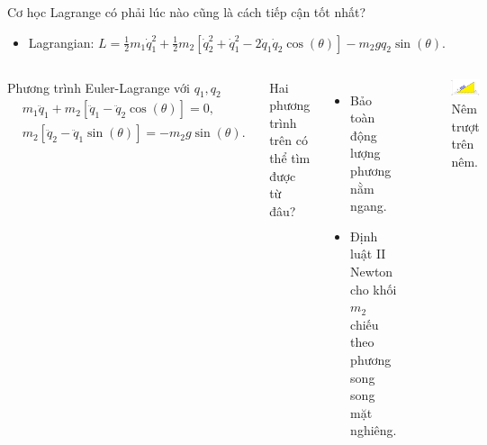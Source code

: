 \begin{frame}{Cơ học Lagrange có phải lúc nào cũng là cách tiếp cận tốt nhất?}
\vspace{-2mm}
\begin{itemize}
    \item Lagrangian: \(L = \frac{1}{2} m_1 \dot{q}_1^2 + \frac{1}{2} m_2 \left[ \dot{q}_2^2 + \dot{q}_1^2 - 2 \dot{q}_1 \dot{q}_2 \cos (\theta) \right] - m_2 g q_2 \sin (\theta).\)
\end{itemize}

\begin{columns}
    Phương trình Euler-Lagrange với \(q_1, q_2\)
    \begin{equation}
    \begin{split}
        & m_1 \ddot{q}_1 + m_2 \left[ \ddot{q}_1 - \ddot{q}_2 \cos (\theta) \right] = 0,\\
        & m_2 \left[ \ddot{q}_2 - \ddot{q}_1 \sin (\theta) \right] = - m_2 g \sin (\theta).
    \end{split}
    \end{equation}

    Hai phương trình trên có thể tìm được từ đâu?
    \begin{itemize}
        \item Bảo toàn động lượng phương nằm ngang.
        \item Định luật II Newton cho khối \(m_2\) chiếu theo phương song song mặt nghiêng.
    \end{itemize}

    \begin{figure}
        \centering
        \includegraphics[width=0.9\linewidth]{Figures/Sliding_wedge.pdf}
        \caption{Nêm trượt trên nêm.}
        \label{fig:Sliding_wedge}
    \end{figure}
\end{columns}
\end{frame}

